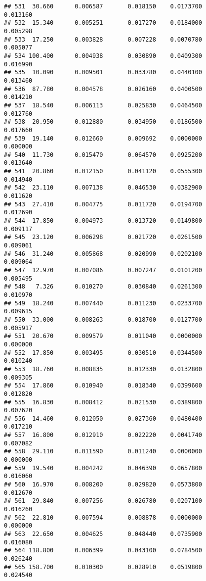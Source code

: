 \documentclass[
]{article}
\begin{document}
\begin{verbatim}
## 531  30.660      0.006587       0.018150    0.0173700          0.013160
## 532  15.340      0.005251       0.017270    0.0184000          0.005298
## 533  17.250      0.003828       0.007228    0.0070780          0.005077
## 534 100.400      0.004938       0.030890    0.0409300          0.016990
## 535  10.090      0.009501       0.033780    0.0440100          0.013460
## 536  87.780      0.004578       0.026160    0.0400500          0.014210
## 537  18.540      0.006113       0.025830    0.0464500          0.012760
## 538  20.950      0.012880       0.034950    0.0186500          0.017660
## 539  19.140      0.012660       0.009692    0.0000000          0.000000
## 540  11.730      0.015470       0.064570    0.0925200          0.013640
## 541  20.860      0.012150       0.041120    0.0555300          0.014940
## 542  23.110      0.007138       0.046530    0.0382900          0.011620
## 543  27.410      0.004775       0.011720    0.0194700          0.012690
## 544  17.850      0.004973       0.013720    0.0149800          0.009117
## 545  23.120      0.006298       0.021720    0.0261500          0.009061
## 546  31.240      0.005868       0.020990    0.0202100          0.009064
## 547  12.970      0.007086       0.007247    0.0101200          0.005495
## 548   7.326      0.010270       0.030840    0.0261300          0.010970
## 549  18.240      0.007440       0.011230    0.0233700          0.009615
## 550  33.000      0.008263       0.018700    0.0127700          0.005917
## 551  20.670      0.009579       0.011040    0.0000000          0.000000
## 552  17.850      0.003495       0.030510    0.0344500          0.010240
## 553  18.760      0.008835       0.012330    0.0132800          0.009305
## 554  17.860      0.010940       0.018340    0.0399600          0.012820
## 555  16.830      0.008412       0.021530    0.0389800          0.007620
## 556  14.460      0.012050       0.027360    0.0480400          0.017210
## 557  16.800      0.012910       0.022220    0.0041740          0.007082
## 558  29.110      0.011590       0.011240    0.0000000          0.000000
## 559  19.540      0.004242       0.046390    0.0657800          0.016060
## 560  16.970      0.008200       0.029820    0.0573800          0.012670
## 561  29.840      0.007256       0.026780    0.0207100          0.016260
## 562  22.810      0.007594       0.008878    0.0000000          0.000000
## 563  22.650      0.004625       0.048440    0.0735900          0.016080
## 564 118.800      0.006399       0.043100    0.0784500          0.026240
## 565 158.700      0.010300       0.028910    0.0519800          0.024540

\end{verbatim}
\end{document}
